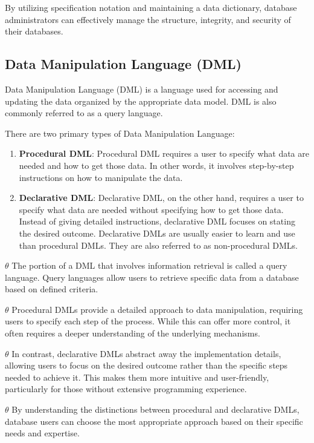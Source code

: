 \documentclass{article}
\begin{document}
By utilizing specification notation and maintaining a data dictionary, database administrators can effectively manage the structure, integrity, and security of their databases.

\subsection*{Data Manipulation Language (DML)}

Data Manipulation Language (DML) is a language used for accessing and updating the data organized by the appropriate data model. DML is also commonly referred to as a query language.

There are two primary types of Data Manipulation Language:

\begin{enumerate}
    \item \textbf{Procedural DML}: Procedural DML requires a user to specify what data are needed and how to get those data. In other words, it involves step-by-step instructions on how to manipulate the data.
    
    \item \textbf{Declarative DML}: Declarative DML, on the other hand, requires a user to specify what data are needed without specifying how to get those data. Instead of giving detailed instructions, declarative DML focuses on stating the desired outcome. Declarative DMLs are usually easier to learn and use than procedural DMLs. They are also referred to as non-procedural DMLs.
\end{enumerate}

$\theta$ The portion of a DML that involves information retrieval is called a query language. Query languages allow users to retrieve specific data from a database based on defined criteria.

$\theta$ Procedural DMLs provide a detailed approach to data manipulation, requiring users to specify each step of the process. While this can offer more control, it often requires a deeper understanding of the underlying mechanisms.

$\theta$ In contrast, declarative DMLs abstract away the implementation details, allowing users to focus on the desired outcome rather than the specific steps needed to achieve it. This makes them more intuitive and user-friendly, particularly for those without extensive programming experience.

$\theta$ By understanding the distinctions between procedural and declarative DMLs, database users can choose the most appropriate approach based on their specific needs and expertise.
\end{document}
